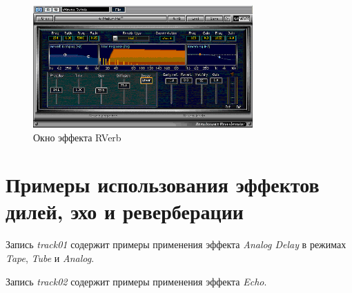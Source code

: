 \documentclass[oneside, final, 14pt]{extreport}
\begin{document}
\begin{figure}[h!]
  \centering
  \includegraphics[width=0.75\textwidth]{pic-wavesrverb-01}
  \caption{Окно эффекта RVerb}
  \label{pic-wavesrverb-01}
\end{figure}

\section{Примеры использования эффектов дилей, эхо и реверберации}
Запись \emph{track01} содержит примеры применения эффекта \emph{Analog Delay} в режимах \emph{Tape}, \emph{Tube} и \emph{Analog}.

Запись \emph{track02} содержит примеры применения эффекта \emph{Echo}.
\end{document}
